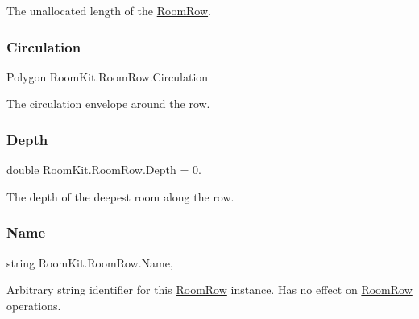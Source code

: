 The unallocated length of the \mbox{\hyperlink{class_room_kit_1_1_room_row}{Room\+Row}}. 

\mbox{\label{class_room_kit_1_1_room_row_a599df29134a583704e48d2f7b59cb244}} 
\subsubsection{\texorpdfstring{Circulation}{Circulation}}
{\footnotesize\ttfamily Polygon Room\+Kit.\+Room\+Row.\+Circulation\hspace{0.3cm}{\ttfamily [get]}}



The circulation envelope around the row. 

\mbox{\label{class_room_kit_1_1_room_row_a3c5718e6696e88c4c0f91154751f59f8}} 
\subsubsection{\texorpdfstring{Depth}{Depth}}
{\footnotesize\ttfamily double Room\+Kit.\+Room\+Row.\+Depth = 0.\hspace{0.3cm}{\ttfamily [get]}}



The depth of the deepest room along the row. 

\mbox{\label{class_room_kit_1_1_room_row_a99bed9136ed8a01c5174e734c24a264e}} 
\subsubsection{\texorpdfstring{Name}{Name}}
{\footnotesize\ttfamily string Room\+Kit.\+Room\+Row.\+Name\hspace{0.3cm}{\ttfamily [get]}, {\ttfamily [set]}}



Arbitrary string identifier for this \mbox{\hyperlink{class_room_kit_1_1_room_row}{Room\+Row}} instance. Has no effect on \mbox{\hyperlink{class_room_kit_1_1_room_row}{Room\+Row}} operations. 


